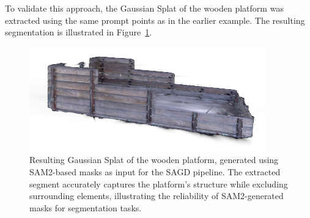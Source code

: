 \documentclass[12pt]{article}
\begin{document}
To validate this approach, the Gaussian Splat of the wooden platform was extracted using the same prompt points as in the earlier example. The resulting segmentation is illustrated in Figure~\ref{fig:sagdwoodply}.
\begin{figure}[h!]
	\centering
	\includegraphics[width=\textwidth]{Images/sagdwoodply.png}
	\caption{Resulting Gaussian Splat of the wooden platform, generated using SAM2-based masks as input for the SAGD pipeline. The extracted segment accurately captures the platform’s structure while excluding surrounding elements, illustrating the reliability of SAM2-generated masks for segmentation tasks.
	}
	\label{fig:sagdwoodply}
\end{figure}
\FloatBarrier
\noindent
\end{document}
